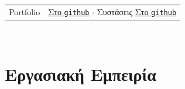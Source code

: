 \documentclass[a4paper,10pt,twoside]{article}
\begin{document}
\begin{tabular}{rp{9cm}}
  Portfolio & \href{https://docs.google.com/viewer?url=https://raw.githubusercontent.com/li9i/portfolio/master/portfolio.pdf}{Στο \texttt{github}} $\cdot$
  Συστάσεις \href{https://docs.google.com/viewerng/viewer?url=https://raw.githubusercontent.com/li9i/cv/master/references/references_alexandros_filotheou.pdf}{Στο \texttt{github}} \\
\end{tabular} \\
\vfill
\tableofcontents
\newpage

\section{Εργασιακή Εμπειρία}
\end{document}
